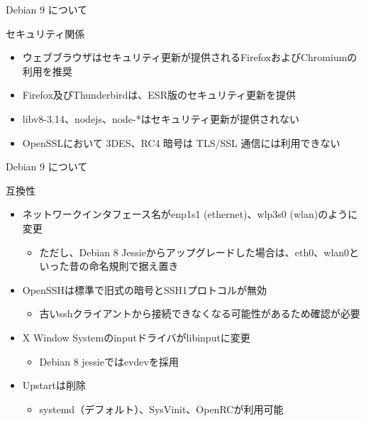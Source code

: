 \begin{frame}{Debian 9 について}%

セキュリティ関係
\begin{itemize}
\item ウェブブラウザはセキュリティ更新が提供されるFirefoxおよびChromiumの利用を推奨
\item Firefox及びThunderbirdは、ESR版のセキュリティ更新を提供
\item libv8-3.14、nodejs、node-*はセキュリティ更新が提供されない
\item OpenSSLにおいて 3DES、RC4 暗号は TLS/SSL 通信には利用できない
\end{itemize}

\end{frame}


\begin{frame}{Debian 9 について}%

互換性
\begin{itemize}
\item ネットワークインタフェース名がenp1s1 (ethernet)、wlp3s0 (wlan)のように変更
  \begin{itemize}
  \item ただし、Debian 8 Jessieからアップグレードした場合は、eth0、wlan0といった昔の命名規則で据え置き
  \end{itemize}
\item OpenSSHは標準で旧式の暗号とSSH1プロトコルが無効
  \begin{itemize}
  \item 古いsshクライアントから接続できなくなる可能性があるため確認が必要
  \end{itemize}
\item X Window Systemのinputドライバがlibinputに変更
  \begin{itemize}
  \item Debian 8 jessieではevdevを採用
  \end{itemize}
\item Upstartは削除
  \begin{itemize}
  \item systemd（デフォルト）、SysVinit、OpenRCが利用可能
  \end{itemize}
\end{itemize}

\end{frame}


